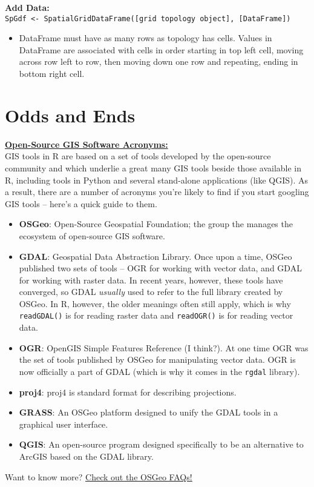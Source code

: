 \documentclass[10pt]{article}
\begin{document}
\textbf{Add Data:} \\
\texttt{SpGdf <- SpatialGridDataFrame([grid topology object], [DataFrame])}
\begin{itemize}
	\item DataFrame must have as many rows as topology has cells. Values in DataFrame are associated with cells in order starting in top left cell, moving across row left to row, then moving down one row and repeating, ending in bottom right cell. 
\end{itemize}


\section*{Odds and Ends}
\underline{\textbf{Open-Source GIS Software Acronyms:} }\\

\noindent GIS tools in R are based on a set of tools developed by the open-source community and which underlie a great many GIS tools beside those available in R, including tools in Python and several stand-alone applications (like QGIS). As a result, there are a number of acronyms you're likely to find if you start googling GIS tools -- here's a quick guide to them. \\
\begin{itemize}
	\item \textbf{OSGeo}: Open-Source Geospatial Foundation; the group the manages the ecosystem of open-source GIS software. 
	\item \textbf{GDAL}: Geospatial Data Abstraction Library. Once upon a time, OSGeo published two sets of tools -- OGR for working with vector data, and GDAL for working with raster data. In recent years, however, these tools have converged, so GDAL \emph{usually} used to refer to the full library created by OSGeo. In R, however, the older meanings often still apply, which is why \texttt{readGDAL()} is for reading raster data and \texttt{readOGR()} is for reading vector data. 
	\item \textbf{OGR}: OpenGIS Simple Features Reference (I think?). At one time OGR was the set of tools published by OSGeo for manipulating vector data. OGR is now officially a part of GDAL (which is why it comes in the \texttt{rgdal} library). 
	\item \textbf{proj4}: proj4 is standard format for describing projections.
	\item \textbf{GRASS}: An OSGeo platform designed to unify the GDAL tools in a graphical user interface. 
	\item \textbf{QGIS}: An open-source program designed specifically to be an alternative to ArcGIS based on the GDAL library. 
\end{itemize}
Want to know more? \href{https://trac.osgeo.org/gdal/wiki/FAQGeneral#WhatdoesOGRstandsfor}{\underline{Check out the OSGeo FAQs!}}

\end{document}
